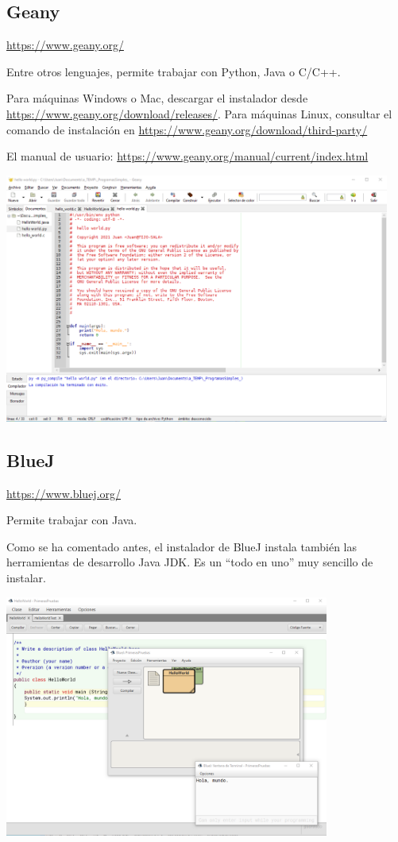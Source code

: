 \documentclass[spanish,12pt,a4paper,final,oneside]{book}
\begin{document}
\subsection{Geany}

\url{https://www.geany.org/}

Entre otros lenguajes, permite trabajar con Python, Java o C/C++.

Para máquinas Windows o Mac, descargar el instalador desde \url{https://www.geany.org/download/releases/}. Para máquinas Linux, consultar el comando de instalación en \url{https://www.geany.org/download/third-party/}

El manual de usuario: \url{https://www.geany.org/manual/current/index.html}

\includegraphics[width=0.95\textwidth]{pantallazo de Geany.png}


\subsection{BlueJ}

\url{https://www.bluej.org/}

Permite trabajar con Java. 

Como se ha comentado antes, el instalador de BlueJ instala también las herramientas de desarrollo Java JDK. Es un ``todo en uno'' muy sencillo de instalar.

\includegraphics[width=0.8\textwidth]{pantallazo de BlueJ.png}
\end{document}
